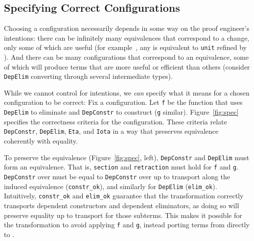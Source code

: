 \subsection{Specifying Correct Configurations}
\label{sec:art}


Choosing a configuration necessarily depends in some way on the proof engineer's intentions:
there can be infinitely many equivalences that correspond to a 
change, only some of which are useful (for example~, any \A is equivalent to \lstinline{unit} refined by \A). %
And there can be many configurations that correspond
to an equivalence, some of which will produce terms that are more useful or efficient than others
(consider \lstinline{DepElim} converting through several intermediate types).

While we cannot control for intentions, we \textit{can} specify what it means for a chosen configuration to be correct:
Fix a configuration. Let \lstinline{f} be the function that uses \lstinline{DepElim} to eliminate \A and \lstinline{DepConstr} to construct \B (\lstinline{g} similar). %
Figure~\ref{fig:spec} specifies the correctness criteria for the configuration.
These criteria relate \lstinline{DepConstr}, \lstinline{DepElim}, \lstinline{Eta}, and \lstinline{Iota}
in a way that preserves equivalence coherently with equality.

To preserve the equivalence (Figure~\ref{fig:spec}, left), \lstinline{DepConstr} and \lstinline{DepElim} must form an equivalence. %
That is, \lstinline{section} and \lstinline{retraction} must hold for \lstinline{f} and \lstinline{g}.
\lstinline{DepConstr} over \B must be equal to \lstinline{DepConstr} over \A up to transport along the induced equivalence (\lstinline{constr_ok}), 
and similarly for \lstinline{DepElim} (\lstinline{elim_ok}).
Intuitively, \lstinline{constr_ok} and \lstinline{elim_ok} guarantee that the transformation
correctly transports dependent constructors and dependent eliminators,
as doing so will preserve equality up to transport for those subterms.
This makes it possible for the transformation
to avoid applying \lstinline{f} and \lstinline{g}, instead porting terms from \A directly to \B.

